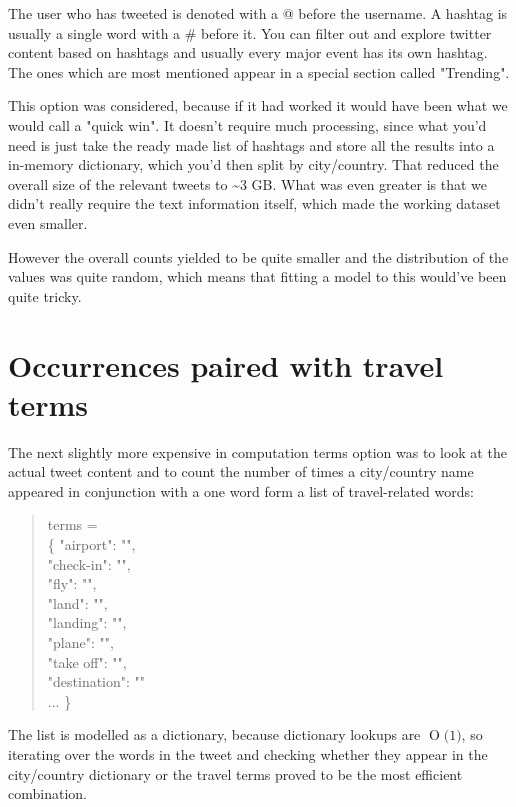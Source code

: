 \documentclass[minf,frontabs,twoside,singlespacing,parskip]{infthesis}
\newcommand{\BigO}[1]{\ensuremath{\operatorname{O}\bigl(#1\bigr)}}
\begin{document}
The user who has tweeted is denoted with a @ before the username. A hashtag is usually a single word with a \# before it. 
You can filter out and explore twitter content based on hashtags and usually every major event has its own hashtag. The ones which are most mentioned appear in a special section called "Trending".

This option was considered, because if it had worked it would have been what we would call a "quick win". It doesn't require much processing, since what you'd need is just take the ready made list of hashtags and store all the results into a in-memory dictionary, which you'd then split by city/country. That reduced the overall size of the relevant tweets to \textasciitilde 3 GB. What was even greater is that we didn't really require the text information itself, which made the working dataset even smaller. 

However the overall counts yielded to be quite smaller and the distribution of the values was quite random, which means that fitting a model to this would've been quite tricky. 

\section{Occurrences paired with travel terms} 

The next slightly more expensive in computation terms option was to look at the actual tweet content and to count the number of times a city/country name appeared in conjunction with a one word form a list of travel-related words:

\begin{quotation}
terms = \\
\{ "airport": "", \\
"check-in": "", \\
"fly": "", \\
"land": "", \\ 
"landing": "", \\
"plane": "", \\ 
"take off": "", \\
"destination": "" \\
... \}
\end{quotation}

The list is modelled as a dictionary, because dictionary lookups are \BigO{1}, so iterating over the words in the tweet and checking whether they appear in the city/country dictionary or the travel terms proved to be the most efficient combination.
\end{document}
